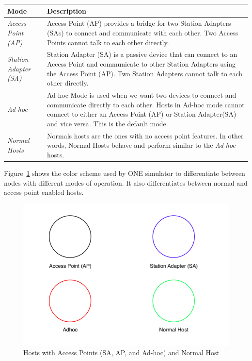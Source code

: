 	\begin{center}
	    \begin{tabular}{ | l | p{10.5cm} |}
    		\hline
    		\textbf{Mode} & \textbf{Description} \\ \hline
    		\textit{Access Point (AP)} & Access Point (AP) provides a bridge for two Station Adapters (SAs) to connect and communicate with each other. Two Access Points cannot talk to each other directly. \\ \hline
    		\textit{Station Adapter (SA)} & Station Adapter (SA) is a passive device that can connect to an Access Point and communicate to other Station Adapters using the Access Point (AP). Two Station Adapters cannot talk to each other directly. \\ \hline
    		\textit{Ad-hoc} & Ad-hoc Mode is used when we want two devices to connect and communicate directly to each other. Hosts in Ad-hoc mode cannot connect to either an Access Point (AP) or Station Adapter(SA) and vice versa. This is the default mode.\\ \hline
				\textit{Normal Hosts} & Normals hosts are the ones with no access point features. In other words, Normal Hosts behave and perform similar to the \textit{Ad-hoc} hosts.\\ \hline
			\end{tabular}
	\end{center}
	\vspace{5mm}
	Figure~\ref{fig:aps1} shows the color scheme used by ONE simulator to differentiate between nodes with different modes of operation. It also differentiates between normal and access point enabled hosts.\newline
	\begin{figure}[h]
		\centering
		\includegraphics[scale=0.4]{./figures/aps-1}
		\caption{Hosts with Access Points (SA, AP, and Ad-hoc) and Normal Host}
		\label{fig:aps1}
	\end{figure}
